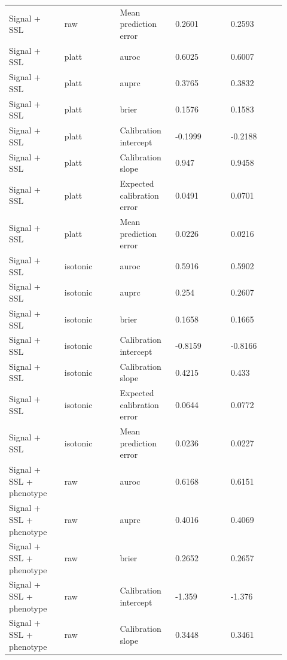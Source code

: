\documentclass[utf8]{frontiers_suppmat}
\begin{document}
\begin{landscape}
\begin{longtable}{L{0.184\linewidth} L{0.184\linewidth} L{0.184\linewidth} L{0.184\linewidth} L{0.184\linewidth}}
Signal + SSL & raw & Mean prediction error & 0.\allowbreak{}2601 & 0.\allowbreak{}2593 \\
Signal + SSL & platt & auroc & 0.\allowbreak{}6025 & 0.\allowbreak{}6007 \\
Signal + SSL & platt & auprc & 0.\allowbreak{}3765 & 0.\allowbreak{}3832 \\
Signal + SSL & platt & brier & 0.\allowbreak{}1576 & 0.\allowbreak{}1583 \\
Signal + SSL & platt & Calibration intercept & -\allowbreak{}0.\allowbreak{}1999 & -\allowbreak{}0.\allowbreak{}2188 \\
Signal + SSL & platt & Calibration slope & 0.\allowbreak{}947 & 0.\allowbreak{}9458 \\
Signal + SSL & platt & Expected calibration error & 0.\allowbreak{}0491 & 0.\allowbreak{}0701 \\
Signal + SSL & platt & Mean prediction error & 0.\allowbreak{}0226 & 0.\allowbreak{}0216 \\
Signal + SSL & isotonic & auroc & 0.\allowbreak{}5916 & 0.\allowbreak{}5902 \\
Signal + SSL & isotonic & auprc & 0.\allowbreak{}254 & 0.\allowbreak{}2607 \\
Signal + SSL & isotonic & brier & 0.\allowbreak{}1658 & 0.\allowbreak{}1665 \\
Signal + SSL & isotonic & Calibration intercept & -\allowbreak{}0.\allowbreak{}8159 & -\allowbreak{}0.\allowbreak{}8166 \\
Signal + SSL & isotonic & Calibration slope & 0.\allowbreak{}4215 & 0.\allowbreak{}433 \\
Signal + SSL & isotonic & Expected calibration error & 0.\allowbreak{}0644 & 0.\allowbreak{}0772 \\
Signal + SSL & isotonic & Mean prediction error & 0.\allowbreak{}0236 & 0.\allowbreak{}0227 \\
Signal + SSL + phenotype & raw & auroc & 0.\allowbreak{}6168 & 0.\allowbreak{}6151 \\
Signal + SSL + phenotype & raw & auprc & 0.\allowbreak{}4016 & 0.\allowbreak{}4069 \\
Signal + SSL + phenotype & raw & brier & 0.\allowbreak{}2652 & 0.\allowbreak{}2657 \\
Signal + SSL + phenotype & raw & Calibration intercept & -\allowbreak{}1.\allowbreak{}359 & -\allowbreak{}1.\allowbreak{}376 \\
Signal + SSL + phenotype & raw & Calibration slope & 0.\allowbreak{}3448 & 0.\allowbreak{}3461 \\

\end{longtable}
\end{landscape}
\end{document}
